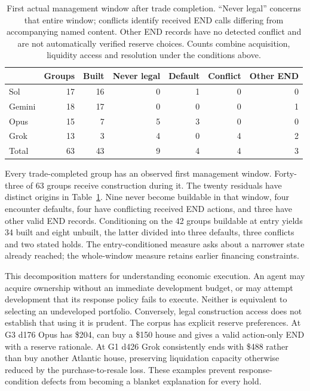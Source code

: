 \documentclass[11pt,letterpaper]{article}
\begin{document}
\begin{table}[t]
\centering\small
\begin{tabular}{lrrrrrr}
\toprule & Groups & Built & Never legal & Default & Conflict & Other END\\\midrule
Sol & 17 & 16 & 0 & 1 & 0 & 0\\
Gemini & 18 & 17 & 0 & 0 & 0 & 1\\
Opus & 15 & 7 & 5 & 3 & 0 & 0\\
Grok & 13 & 3 & 4 & 0 & 4 & 2\\\midrule
Total & 63 & 43 & 9 & 4 & 4 & 3\\\bottomrule
\end{tabular}
\caption{First actual management window after trade completion. ``Never legal'' concerns that entire window; conflicts identify received END calls differing from accompanying named content. Other END records have no detected conflict and are not automatically verified reserve choices. Counts combine acquisition, liquidity access and resolution under the conditions above.}
\label{tab:management}
\end{table}

Every trade-completed group has an observed first management window. Forty-three of 63 groups receive construction during it. The twenty residuals have distinct origins in Table~\ref{tab:management}. Nine never become buildable in that window, four encounter defaults, four have conflicting received END actions, and three have other valid END records. Conditioning on the 42 groups buildable at entry yields 34 built and eight unbuilt, the latter divided into three defaults, three conflicts and two stated holds. The entry-conditioned measure asks about a narrower state already reached; the whole-window measure retains earlier financing constraints.

This decomposition matters for understanding economic execution. An agent may acquire ownership without an immediate development budget, or may attempt development that its response policy fails to execute. Neither is equivalent to selecting an undeveloped portfolio. Conversely, legal construction access does not establish that using it is prudent. The corpus has explicit reserve preferences. At G3 d176 Opus has \$204, can buy a \$150 house and gives a valid action-only END with a reserve rationale. At G1 d426 Grok consistently ends with \$488 rather than buy another Atlantic house, preserving liquidation capacity otherwise reduced by the purchase-to-resale loss. These examples prevent response-condition defects from becoming a blanket explanation for every hold.
\end{document}
